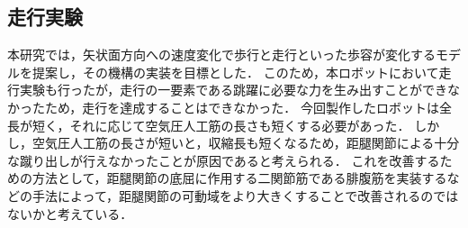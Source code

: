 \subsection{走行実験}
本研究では，矢状面方向への速度変化で歩行と走行といった歩容が変化するモデルを提案し，その機構の実装を目標とした．
このため，本ロボットにおいて走行実験も行ったが，走行の一要素である跳躍に必要な力を生み出すことができなかったため，走行を達成することはできなかった．
今回製作したロボットは全長が短く，それに応じて空気圧人工筋の長さも短くする必要があった．
しかし，空気圧人工筋の長さが短いと，収縮長も短くなるため，距腿関節による十分な蹴り出しが行えなかったことが原因であると考えられる．
これを改善するための方法として，距腿関節の底屈に作用する二関節筋である腓腹筋を実装するなどの手法によって，距腿関節の可動域をより大きくすることで改善されるのではないかと考えている．